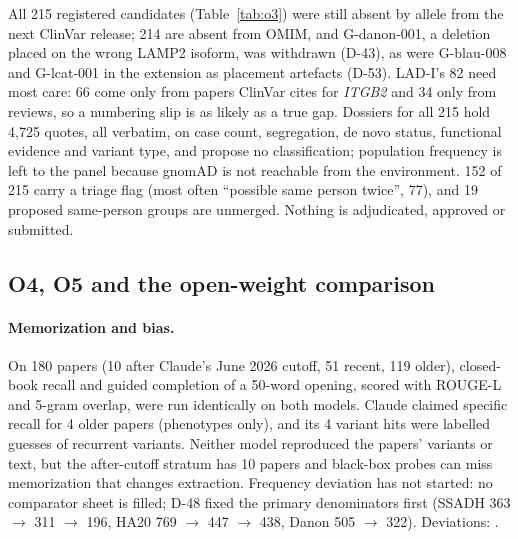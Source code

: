 \documentclass{article} %
\begin{document}
All 215 registered candidates (Table~\ref{tab:o3}) were still absent by allele from the next ClinVar release; 214 are absent from OMIM, and G-danon-001, a deletion placed on the wrong LAMP2 isoform, was withdrawn (D-43), as were G-blau-008 and G-lcat-001 in the extension as placement artefacts (D-53). LAD-I's 82 need most care: 66 come only from papers ClinVar cites for \emph{ITGB2} and 34 only from reviews, so a numbering slip is as likely as a true gap. Dossiers for all 215 hold 4,725 quotes, all verbatim, on case count, segregation, de novo status, functional evidence and variant type, and propose no classification; population frequency is left to the panel because gnomAD \citep{Karczewski2020MutationalConstraint} is not reachable from the environment. 152 of 215 carry a triage flag (most often ``possible same person twice'', 77), and 19 proposed same-person groups are unmerged. Nothing is adjudicated, approved or submitted.

\subsection{O4, O5 and the open-weight comparison}
\paragraph{Memorization and bias.} On 180 papers (10 after Claude's June 2026 cutoff, 51 recent, 119 older), closed-book recall and guided completion of a 50-word opening, scored with ROUGE-L \citep{Lin2002ManualAutomatic} and 5-gram overlap, were run identically on both models. Claude claimed specific recall for 4 older papers (phenotypes only), and its 4 variant hits were labelled guesses of recurrent variants. Neither model reproduced the papers' variants or text, but the after-cutoff stratum has 10 papers and black-box probes can miss memorization that changes extraction. Frequency deviation has not started: no comparator sheet is filled; D-48 fixed the primary denominators first (SSADH 363 $\rightarrow$ 311 $\rightarrow$ 196, HA20 769 $\rightarrow$ 447 $\rightarrow$ 438, Danon 505 $\rightarrow$ 322). Deviations: .
\end{document}
